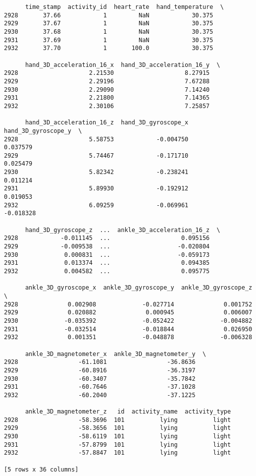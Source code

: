 \documentclass[11pt]{article}
\begin{document}
    
    \begin{verbatim}
      time_stamp  activity_id  heart_rate  hand_temperature  \
2928       37.66            1         NaN            30.375   
2929       37.67            1         NaN            30.375   
2930       37.68            1         NaN            30.375   
2931       37.69            1         NaN            30.375   
2932       37.70            1       100.0            30.375   

      hand_3D_acceleration_16_x  hand_3D_acceleration_16_y  \
2928                    2.21530                    8.27915   
2929                    2.29196                    7.67288   
2930                    2.29090                    7.14240   
2931                    2.21800                    7.14365   
2932                    2.30106                    7.25857   

      hand_3D_acceleration_16_z  hand_3D_gyroscope_x  hand_3D_gyroscope_y  \
2928                    5.58753            -0.004750             0.037579   
2929                    5.74467            -0.171710             0.025479   
2930                    5.82342            -0.238241             0.011214   
2931                    5.89930            -0.192912             0.019053   
2932                    6.09259            -0.069961            -0.018328   

      hand_3D_gyroscope_z  ...  ankle_3D_acceleration_16_z  \
2928            -0.011145  ...                    0.095156   
2929            -0.009538  ...                   -0.020804   
2930             0.000831  ...                   -0.059173   
2931             0.013374  ...                    0.094385   
2932             0.004582  ...                    0.095775   

      ankle_3D_gyroscope_x  ankle_3D_gyroscope_y  ankle_3D_gyroscope_z  \
2928              0.002908             -0.027714              0.001752   
2929              0.020882              0.000945              0.006007   
2930             -0.035392             -0.052422             -0.004882   
2931             -0.032514             -0.018844              0.026950   
2932              0.001351             -0.048878             -0.006328   

      ankle_3D_magnetometer_x  ankle_3D_magnetometer_y  \
2928                 -61.1081                 -36.8636   
2929                 -60.8916                 -36.3197   
2930                 -60.3407                 -35.7842   
2931                 -60.7646                 -37.1028   
2932                 -60.2040                 -37.1225   

      ankle_3D_magnetometer_z   id  activity_name  activity_type  
2928                 -58.3696  101          lying          light  
2929                 -58.3656  101          lying          light  
2930                 -58.6119  101          lying          light  
2931                 -57.8799  101          lying          light  
2932                 -57.8847  101          lying          light  

[5 rows x 36 columns]
    \end{verbatim}
\end{document}
